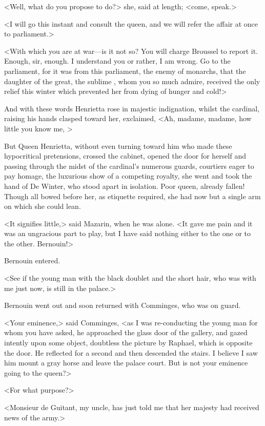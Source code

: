 <Well, what do you propose to do?> she, said at length; <come, speak.>

<I will go this instant and consult the queen, and we will refer the affair at once to parliament.>

<With which you are at war—is it not so? You will charge Broussel to report it. Enough, sir, enough. I understand you or rather, I am wrong. Go to the parliament, for it was from this parliament, the enemy of monarchs, that the daughter of the great, the sublime , whom you so much admire, received the only relief this winter which prevented her from dying of hunger and cold!>

And with these words Henrietta rose in majestic indignation, whilst the cardinal, raising his hands clasped toward her, exclaimed, <Ah, madame, madame, how little you know me, >

But Queen Henrietta, without even turning toward him who made these hypocritical pretensions, crossed the cabinet, opened the door for herself and passing through the midst of the cardinal's numerous guards, courtiers eager to pay homage, the luxurious show of a competing royalty, she went and took the hand of De Winter, who stood apart in isolation. Poor queen, already fallen! Though all bowed before her, as etiquette required, she had now but a single arm on which she could lean.

<It signifies little,> said Mazarin, when he was alone. <It gave me pain and it was an ungracious part to play, but I have said nothing either to the one or to the other. Bernouin!>

Bernouin entered.

<See if the young man with the black doublet and the short hair, who was with me just now, is still in the palace.>

Bernouin went out and soon returned with Comminges, who was on guard.

<Your eminence,> said Comminges, <as I was re-conducting the young man for whom you have asked, he approached the glass door of the gallery, and gazed intently upon some object, doubtless the picture by Raphael, which is opposite the door. He reflected for a second and then descended the stairs. I believe I saw him mount a gray horse and leave the palace court. But is not your eminence going to the queen?>

<For what purpose?>

<Monsieur de Guitant, my uncle, has just told me that her majesty had received news of the army.>

